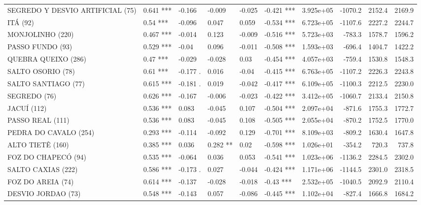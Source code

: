 \documentclass[12pt,oneside]{book}\usepackage[]{graphicx}\usepackage[]{color}
\newenvironment{knitrout}{}{} %
\theoremstyle{definition} %
\begin{document}
\begin{knitrout}
\begin{table}
{\begin{tabular}[t]{llllllrrrr}
SEGREDO Y DESVIO ARTIFICIAL (75) & 0.641 *** & -0.166 & -0.009 & -0.025 & -0.421 *** & 3.925e+05 & -1070.2 & 2152.4 & 2169.9\\
\rowcolor{gray!6}  ITÁ (92) & 0.54 *** & -0.096 & 0.047 & 0.059 & -0.534 *** & 6.723e+05 & -1107.6 & 2227.2 & 2244.7\\
\addlinespace
MONJOLINHO (220) & 0.467 *** & -0.014 & 0.123 & -0.009 & -0.516 *** & 5.723e+03 & -783.3 & 1578.7 & 1596.2\\
\rowcolor{gray!6}  PASSO FUNDO (93) & 0.529 *** & -0.04 & 0.096 & -0.011 & -0.508 *** & 1.593e+03 & -696.4 & 1404.7 & 1422.2\\
QUEBRA QUEIXO (286) & 0.47 *** & -0.029 & -0.028 & 0.03 & -0.454 *** & 4.057e+03 & -759.4 & 1530.8 & 1548.3\\
\rowcolor{gray!6}  SALTO OSORIO (78) & 0.61 *** & -0.177 . & 0.016 & -0.04 & -0.415 *** & 6.763e+05 & -1107.2 & 2226.3 & 2243.8\\
SALTO SANTIAGO (77) & 0.615 *** & -0.181 . & 0.019 & -0.042 & -0.417 *** & 6.109e+05 & -1100.3 & 2212.5 & 2230.0\\
\addlinespace
\rowcolor{gray!6}  SEGREDO (76) & 0.626 *** & -0.167 & -0.006 & -0.023 & -0.422 *** & 3.412e+05 & -1060.7 & 2133.4 & 2150.8\\
JACUÍ (112) & 0.536 *** & 0.083 & -0.045 & 0.107 & -0.504 *** & 2.097e+04 & -871.6 & 1755.3 & 1772.7\\
\rowcolor{gray!6}  PASSO REAL (111) & 0.536 *** & 0.083 & -0.045 & 0.108 & -0.505 *** & 2.055e+04 & -870.2 & 1752.5 & 1770.0\\
PEDRA DO CAVALO (254) & 0.293 *** & -0.114 & -0.092 & 0.129 & -0.701 *** & 8.109e+03 & -809.2 & 1630.4 & 1647.8\\
\rowcolor{gray!6}  ALTO TIETÊ (160) & 0.385 *** & 0.036 & 0.282 ** & 0.02 & -0.598 *** & 1.026e+01 & -354.2 & 720.3 & 737.8\\
\addlinespace
FOZ DO CHAPECÓ (94) & 0.535 *** & -0.064 & 0.036 & 0.053 & -0.541 *** & 1.023e+06 & -1136.2 & 2284.5 & 2302.0\\
\rowcolor{gray!6}  SALTO CAXIAS (222) & 0.586 *** & -0.173 . & 0.027 & -0.044 & -0.424 *** & 1.171e+06 & -1144.5 & 2301.0 & 2318.5\\
FOZ DO AREIA (74) & 0.614 *** & -0.137 & -0.028 & -0.018 & -0.43 *** & 2.532e+05 & -1040.5 & 2092.9 & 2110.4\\
\rowcolor{gray!6}  DESVIO JORDAO (73) & 0.548 *** & -0.143 & 0.057 & -0.086 & -0.445 *** & 1.102e+04 & -827.4 & 1666.8 & 1684.2\\

\end{tabular}}
\end{table}
\end{knitrout}
\end{document}
